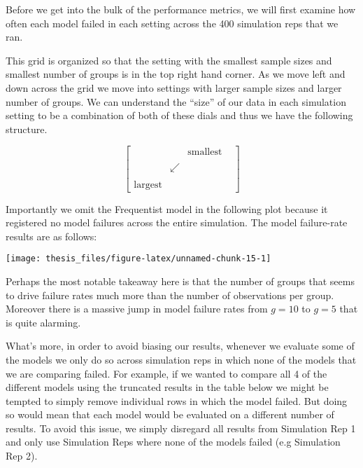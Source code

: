 \documentclass[12pt,twoside]{reedthesis}
\begin{document}
Before we get into the bulk of the performance metrics, we will first examine how often each model failed in each setting across the 400 simulation reps that we ran.

This grid is organized so that the setting with the smallest sample sizes and smallest number of groups is in the top right hand corner. As we move left and down across the grid we move into settings with larger sample sizes and larger number of groups. We can understand the ``size'' of our data in each simulation setting to be a combination of both of these dials and thus we have the following structure.

\[
\begin{bmatrix}
 &  & \text{smallest} \\
 & & & \\
 & \swarrow &  \\
 & & & \\
\text{largest} & & 
\end{bmatrix}
\]

Importantly we omit the Frequentist model in the following plot because it registered no model failures across the entire simulation. The model failure-rate results are as follows:
\begin{center}\texttt{[image: thesis\_files/figure-latex/unnamed-chunk-15-1]} \end{center}

Perhaps the most notable takeaway here is that the number of groups that seems to drive failure rates much more than the number of observations per group. Moreover there is a massive jump in model failure rates from \(g = 10\) to \(g=5\) that is quite alarming.

What's more, in order to avoid biasing our results, whenever we evaluate some of the models we only do so across simulation reps in which none of the models that we are comparing failed. For example, if we wanted to compare all 4 of the different models using the truncated results in the table below we might be tempted to simply remove individual rows in which the model failed. But doing so would mean that each model would be evaluated on a different number of results. To avoid this issue, we simply disregard all results from Simulation Rep 1 and only use Simulation Reps where none of the models failed (e.g Simulation Rep 2).
\end{document}
